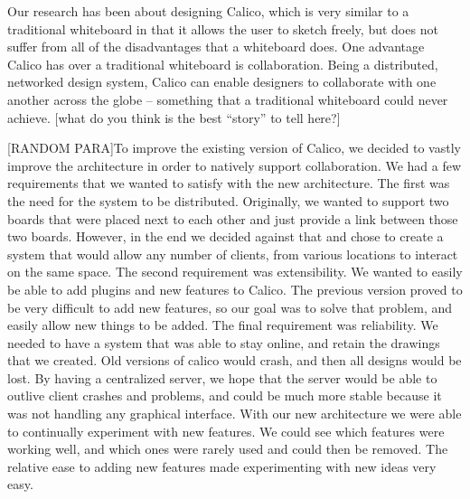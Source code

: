 Our research has been about designing Calico, which is very similar to a traditional whiteboard in that it allows the user to sketch freely, but does not suffer from all of the disadvantages that a whiteboard does. One advantage Calico has over a traditional whiteboard is collaboration. Being a distributed, networked design system, Calico can enable designers to collaborate with one another across the globe – something that a traditional whiteboard could never achieve. [what do you think is the best “story” to tell here?]

[RANDOM PARA]To improve the existing version of Calico, we decided to vastly improve the architecture in order to natively support collaboration. We had a few requirements that we wanted to satisfy with the new architecture. The first was the need for the system to be distributed. Originally, we wanted to support two boards that were placed next to each other and just provide a link between those two boards. However, in the end we decided against that and chose to create a system that would allow any number of clients, from various locations to interact on the same space. The second requirement was extensibility. We wanted to easily be able to add plugins and new features to Calico. The previous version proved to be very difficult to add new features, so our goal was to solve that problem, and easily allow new things to be added. The final requirement was reliability. We needed to have a system that was able to stay online, and retain the drawings that we created. Old versions of calico would crash, and then all designs would be lost. By having a centralized server, we hope that the server would be able to outlive client crashes and problems, and could be much more stable because it was not handling any graphical interface. With our new architecture we were able to continually experiment with new features. We could see which features were working well, and which ones were rarely used and could then be removed. The relative ease to adding new features made experimenting with new ideas very easy.
